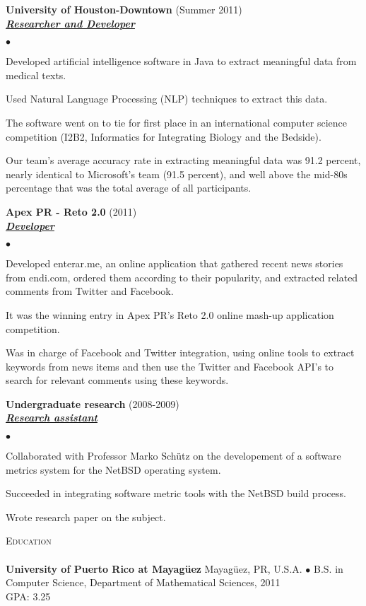 \documentclass{article}
\newcommand{\lineunder}{\vspace*{-8pt} \\ \hspace*{-18pt} \hrulefill \\}
\newcommand{\header}[1]{{\hspace*{-15pt}\vspace*{6pt} \textsc{#1}} \vspace*{-6pt} \lineunder}
\newcommand{\employer}[3]{{ \textbf{#1} (#2)\\ \underline{\textbf{\emph{#3}}}\\  }}
\newenvironment{achievements}{\begin{list}{$\bullet$}{\topsep 0pt \itemsep -2pt}}{\vspace*{4pt}\end{list}}
\newcommand{\school}[4]{
 \textbf{#1} #2 $\bullet$ #3\\
 #4 \\
}
\begin{document}
\employer{University of Houston-Downtown}{Summer 2011}{Researcher and Developer}
	\begin{achievements}
	\item Developed artificial intelligence software in Java to extract meaningful data from medical texts.
	\item Used Natural Language Processing (NLP) techniques to extract this data. 	
	\item The software went on to tie for first place in an international computer science competition (I2B2, Informatics for Integrating Biology and the Bedside).
	\item Our team's average accuracy rate in extracting meaningful data was 91.2 percent, nearly identical to Microsoft's team (91.5 percent), and well above the mid-80s percentage that was the total average of all participants.
 	\end{achievements}

\employer{Apex PR - Reto 2.0}{2011}{Developer}
	\begin{achievements}
	\item Developed enterar.me, an online application that gathered recent news stories from endi.com, ordered them according to their popularity, and extracted related comments from Twitter and Facebook.	
	\item It was the winning entry in Apex PR's Reto 2.0 online mash-up application competition.
	\item Was in charge of Facebook and Twitter integration, using online tools to extract keywords from news items and then use the Twitter and Facebook API's to search for relevant comments using these keywords.
	\end{achievements}

\employer{Undergraduate research}{2008-2009}{Research assistant}
	\begin{achievements}
	\item Collaborated with Professor Marko Sch\"{u}tz on the developement of a software metrics system for the NetBSD operating system.
	\item Succeeded in integrating software metric tools with the NetBSD build process.
	\item Wrote research paper on the subject.
	\end{achievements}

\header{Education}

\school{University of Puerto Rico at Mayag\"{u}ez}{Mayag\"{u}ez, PR, U.S.A.}{B.S. in Computer Science, Department of Mathematical Sciences, 2011}
{GPA: 3.25}
\end{document}
